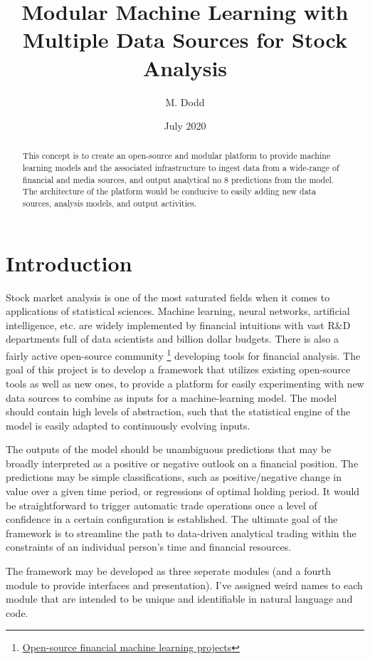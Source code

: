 \documentclass[letterpaper,12pt]{article}
\title{Modular Machine Learning with Multiple Data Sources for Stock Analysis}
\author{M. Dodd}
\date{July 2020}
\begin{document}
\maketitle

\begin{abstract}
    This concept is to create an open-source and modular platform to provide machine learning models and the associated infrastructure to ingest data from a wide-range of financial and media sources, and output analytical no 8 predictions from the model. The architecture of the platform would be conducive to easily adding new data sources, analysis models, and output activities.
\end{abstract}

\section{Introduction}

Stock market analysis is one of the most saturated fields when it comes to applications of statistical sciences. Machine learning, neural networks, artificial intelligence, etc. are widely implemented by financial intuitions with vast R\&D departments full of data scientists and billion dollar budgets. There is also a fairly active open-source community
\footnote{\href{https://github.com/firmai/financial-machine-learning}{Open-source financial machine learning projects}}
developing tools for financial analysis. The goal of this project is to develop a framework that utilizes existing open-source tools as well as new ones, to provide a platform for easily experimenting with new data sources to combine as inputs for a machine-learning model. The model should contain high levels of abstraction, such that the statistical engine of the model is easily adapted to continuously evolving inputs.

The outputs of the model should be unambiguous predictions that may be broadly interpreted as a positive or negative outlook on a financial position. The predictions may be simple classifications, such as positive/negative change in value over a given time period, or regressions of optimal holding period. It would be straightforward to trigger automatic trade operations once a level of confidence in a certain configuration is established. The ultimate goal of the framework is to streamline the path to data-driven analytical trading within the constraints of an individual person's time and financial resources. 

The framework may be developed as three seperate modules (and a fourth module to provide interfaces and presentation). I've assigned weird names to each module that are intended to be unique and identifiable in natural language and code.
\end{document}
